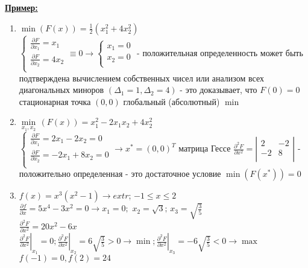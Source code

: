\documentclass[preprint,russian,a5paper,10pt,twoside]{ncc}
\newcommand{\ExampleMy}{\textbf{\underline{Пример:}}}
\begin{document}
\vspace{\baselineskip}
\par\ExampleMy 
\begin{enumerate}
\item $\min \left( F\left( x \right) \right)=\frac{1}{2}\left( x_{1}^{2}+4x_{2}^{2} \right)$\\
$\left\{ \begin{matrix}
   \frac{\partial F}{\partial {{x}_{1}}}={{x}_{1}}  \\
   \frac{\partial F}{\partial {{x}_{2}}}=4{{x}_{2}}  \\
\end{matrix} \right.\equiv 0\to \left\{ \begin{matrix}
   {{x}_{1}}=0  \\
   {{x}_{2}}=0  \\
\end{matrix} \right.$ - положительная определенность может быть подтверждена вычислением собственных чисел или анализом всех диагональных миноров $\left( {{\Delta }_{1}}=1,{{\Delta }_{2}}=4 \right)$ - это доказывает, что $F\left( 0 \right)=0$ стационарная точка $\left( 0,0 \right)$ глобальный (абсолютный) $\min$  

\item $\underset{{{x}_{1}},{{x}_{2}}}{\mathop{\min }}\,\left( F\left( x \right) \right)=x_{1}^{2}-2{{x}_{1}}{{x}_{2}}+4x_{2}^{2}$\\ 
$\left\{ \begin{matrix}
   \frac{\partial F}{\partial {{x}_{1}}}=2{{x}_{1}}-2{{x}_{2}}=0  \\
   \frac{\partial F}{\partial {{x}_{2}}}=-2{{x}_{1}}+8{{x}_{2}}=0  \\
\end{matrix} \right.\to {{x}^{*}}={{\left( 0,0 \right)}^{T}}$
матрица Гессе $\frac{{{\partial }^{2}}F}{\partial {{x}^{2}}}=\left| \begin{matrix}
   2 & -2  \\
   -2 & 8  \\
\end{matrix} \right|$ - положительно определенная - это достаточное условие $\min \left( F\left( {{x}^{*}} \right) \right)=0$
\item $f\left( x \right)={{x}^{3}}\left( {{x}^{2}}-1 \right)\to extr$; $-1\le x\le 2$
\\$\frac{\partial f}{\partial x}=5{{x}^{4}}-3{{x}^{2}}=0\to {{x}_{1}}=0;\,\,{{x}_{2}}=\sqrt{3};\,{{x}_{3}}=\sqrt{\frac{3}{5}}$ \\$\frac{{{\partial }^{2}}F}{\partial {{x}^{2}}}=20{{x}^{2}}-6x$
\\${{\left. \frac{{{\partial }^{2}}F}{\partial {{x}^{2}}} \right|}_{{{x}_{1}}}}=0;{{\left. \frac{{{\partial }^{2}}F}{\partial {{x}^{2}}} \right|}_{{{x}_{2}}}}=6\sqrt{\frac{3}{5}}>0\to \min ;{{\left. \frac{{{\partial }^{2}}F}{\partial {{x}^{2}}} \right|}_{{{x}_{3}}}}=-6\sqrt{\frac{3}{5}}<0\to \max $
\\$f\left( -1 \right)=0,f\left( 2 \right)=24$
\end{enumerate}
\end{document}

